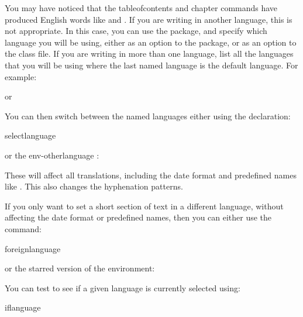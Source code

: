 You may have noticed that the \gls{tableofcontents} and
\gls{chapter} commands have produced English words like
 and . If you are writing in another language, this is not
appropriate. In this case, you can use the  package,
and specify which language you will be using, either as an option to
the  package, or as an option to the class file.  If you are writing in more than
one language, list all the languages that you will be using where
the last named language is the default language. For example:
\begin{alltt}
\end{alltt}
or
\begin{alltt}
\end{alltt}
You can then switch between the named languages either using the 
\gls{declaration}:
\begin{definition}
\gls{selectlanguage}
\end{definition}%
or the \gls{env-otherlanguage} :
\begin{definition}
\end{definition}%
These will affect all translations, including the date format
and predefined names like . This also changes the
\gls{hyphenation} patterns.

If you only want to set a short section of text in a different
language, without affecting the date format or predefined names,
then you can either use the command:
\begin{definition}
\gls{foreignlanguage}
\end{definition}%
or the starred version of the  environment:
\begin{definition}
\end{definition}%
You can test to see if a given language is currently selected
using:
\begin{definition}
\gls{iflanguage}%
\end{definition}%

